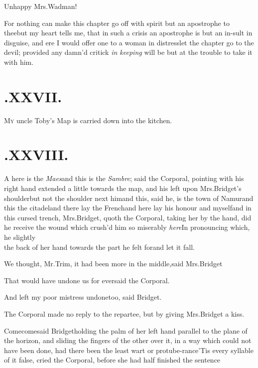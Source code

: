 \documentclass{article}
\begin{document}
Unhappy Mrs.\@ Wadman!\tsh

\tsh For nothing can make this chapter go off with
spirit but an apostrophe to thee\tsh but my heart tells
me, that in such a crisis an apostrophe is but an in-\pb sult in
disguise, and ere I would offer one to a woman in
distress\tsk let the chapter go to the devil; provided any
damn’d critick \textit{in keeping} will be but at the trouble to
take it with him.


\newpage
\null\vfill
\section{.\enspace XXVII.}

\lettrine{M}{y} uncle Toby’s Map is
carried down into the kitchen.
\vfill
\newpage
\section{.\enspace XXVIII.}

\lettrine{\kern -3pt\Tsk A}{} here is the
\textit{Maes}\tsk and this is the \textit{Sambre}; said the Corporal,
pointing with his right hand extended a little towards the map, and
his left upon Mrs.\@ Bridget’s shoulder\tsk\break\tsk but not
the shoulder next him\tsk and this, said he, is the town of
Namur\tsk\break and this the citadel\tsk and there lay the
French\tsk and here lay his honour and
myself\tsh and in this cursed trench, Mrs.\break Bridget,
quoth the Corporal, taking her by the hand, did he receive the wound which crush’d
him so miserably \textit{here}\tsk\break In pronouncing which, he
slightly \\the back of her hand towards the part he
felt for\tsh and let it fall.

\newpage
We thought, Mr.\@ Trim, it had been more in the
middle,\tsh said Mrs.\break Bridget\tsh

\vskip -2pt

That would have undone us for ever\tsk\break said the Corporal.

\vskip -2pt

\tsh And left my poor mistress undone\break too, said Bridget.

\vskip -2pt

The Corporal made no reply to the repartee, but by giving Mrs.\@ Bridget a kiss.

\vskip -2pt

Come\tsk come\tsk said Bridget\tsk holding the palm of her left hand parallel to the plane
of the horizon, and sliding the fingers of the other over it, in a way which could
not have been done, had there been the least wart or protube-\pb rance\tsh ’Tis
every syllable of it false, cried the Corporal, before she had half finished the
sentence\tsh
\end{document}
